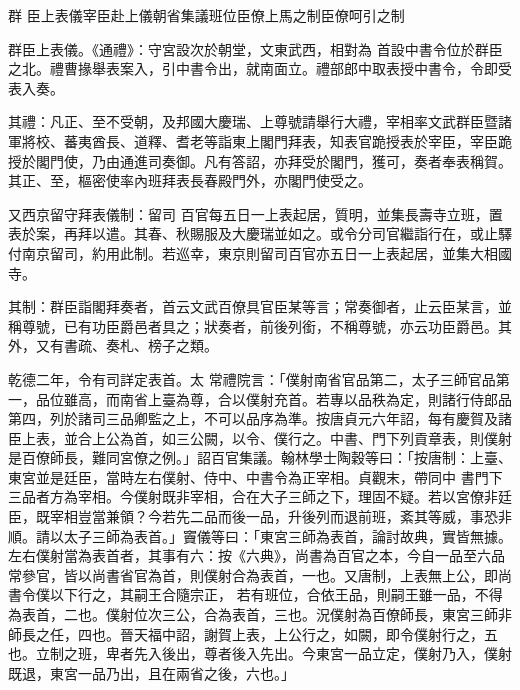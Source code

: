 
\begin{pinyinscope}

 群
 臣上表儀宰臣赴上儀朝省集議班位臣僚上馬之制臣僚呵引之制



 群臣上表儀。《通禮》：守宮設次於朝堂，文東武西，相對為
 首設中書令位於群臣之北。禮曹掾舉表案入，引中書令出，就南面立。禮部郎中取表授中書令，令即受表入奏。



 其禮：凡正、至不受朝，及邦國大慶瑞、上尊號請舉行大禮，宰相率文武群臣暨諸軍將校、蕃夷酋長、道釋、耆老等詣東上閣門拜表，知表官跪授表於宰臣，宰臣跪授於閣門使，乃由通進司奏御。凡有答詔，亦拜受於閣門，獲可，奏者奉表稱賀。其正、至，樞密使率內班拜表長春殿門外，亦閣門使受之。



 又西京留守拜表儀制：留司
 百官每五日一上表起居，質明，並集長壽寺立班，置表於案，再拜以遣。其春、秋賜服及大慶瑞並如之。或令分司官繼詣行在，或止驛付南京留司，約用此制。若巡幸，東京則留司百官亦五日一上表起居，並集大相國寺。



 其制：群臣詣閣拜奏者，首云文武百僚具官臣某等言；常奏御者，止云臣某言，並稱尊號，已有功臣爵邑者具之；狀奏者，前後列銜，不稱尊號，亦云功臣爵邑。其外，又有書疏、奏札、榜子之類。



 乾德二年，令有司詳定表首。太
 常禮院言：「僕射南省官品第二，太子三師官品第一，品位雖高，而南省上臺為尊，合以僕射充首。若專以品秩為定，則諸行侍郎品第四，列於諸司三品卿監之上，不可以品序為準。按唐貞元六年詔，每有慶賀及諸臣上表，並合上公為首，如三公闕，以令、僕行之。中書、門下列貢章表，則僕射是百僚師長，難同宮僚之例。」詔百官集議。翰林學士陶穀等曰：「按唐制：上臺、東宮並是廷臣，當時左右僕射、侍中、中書令為正宰相。貞觀末，帶同中
 書門下三品者方為宰相。今僕射既非宰相，合在大子三師之下，理固不疑。若以宮僚非廷臣，既宰相豈當兼領？今若先二品而後一品，升後列而退前班，紊其等威，事恐非順。請以太子三師為表首。」竇儀等曰：「東宮三師為表首，論討故典，實皆無據。左右僕射當為表首者，其事有六：按《六典》，尚書為百官之本，今自一品至六品常參官，皆以尚書省官為首，則僕射合為表首，一也。又唐制，上表無上公，即尚書令僕以下行之，其嗣王合隨宗正，
 若有班位，合依王品，則嗣王雖一品，不得為表首，二也。僕射位次三公，合為表首，三也。況僕射為百僚師長，東宮三師非師長之任，四也。晉天福中詔，謝賀上表，上公行之，如闕，即令僕射行之，五也。立制之班，卑者先入後出，尊者後入先出。今東宮一品立定，僕射乃入，僕射既退，東宮一品乃出，且在兩省之後，六也。」




\end{pinyinscope}
